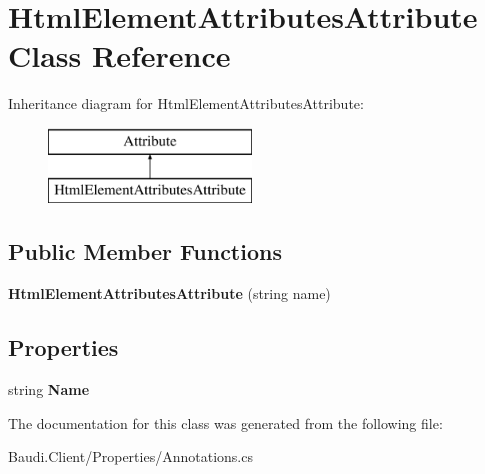 \hypertarget{class_html_element_attributes_attribute}{}\section{Html\+Element\+Attributes\+Attribute Class Reference}
\label{class_html_element_attributes_attribute}
Inheritance diagram for Html\+Element\+Attributes\+Attribute\+:\begin{figure}[H]
\begin{center}
\leavevmode
\includegraphics[height=2.000000cm]{class_html_element_attributes_attribute}
\end{center}
\end{figure}
\subsection*{Public Member Functions}
\begin{DoxyCompactItemize}
\item 
\hypertarget{class_html_element_attributes_attribute_a021a9fc3f28a9025ade505f85e890810}{}{\bfseries Html\+Element\+Attributes\+Attribute} (string name)\label{class_html_element_attributes_attribute_a021a9fc3f28a9025ade505f85e890810}

\end{DoxyCompactItemize}
\subsection*{Properties}
\begin{DoxyCompactItemize}
\item 
\hypertarget{class_html_element_attributes_attribute_a6d108098ab54c1770cb01df2e1051fd7}{}string {\bfseries Name}\label{class_html_element_attributes_attribute_a6d108098ab54c1770cb01df2e1051fd7}

\end{DoxyCompactItemize}


The documentation for this class was generated from the following file\+:\begin{DoxyCompactItemize}
\item 
Baudi.\+Client/\+Properties/Annotations.\+cs\end{DoxyCompactItemize}
